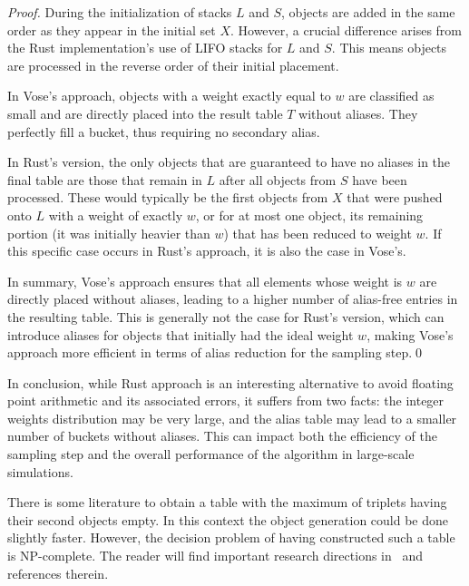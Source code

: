 \begin{proof}
    During the initialization of stacks $L$ and $S$, objects are added in the same order as they appear in the initial set $X$. 
    However, a crucial difference arises from the Rust implementation's use of LIFO stacks for $L$ and $S$. This means objects are processed in the reverse order of their initial placement.

    In Vose's approach, objects with a weight exactly equal to $w$ are classified as small and are directly placed into the result table $T$ without aliases. They perfectly fill a bucket, thus requiring no secondary alias.

    In Rust's version, the only objects that are guaranteed to have no aliases in the final table are those that remain in $L$ after all objects from $S$ have been processed. These would typically be the first objects from $X$ that were pushed onto $L$ with a weight of exactly $w$, or for at most one object, its remaining portion (it was initially heavier than $w$) that has been reduced to weight $w$. If this specific case occurs in Rust's approach, it is also the case in Vose's.

    In summary, Vose's approach ensures that all elements whose weight is $w$ are directly placed without aliases, leading to a higher number of alias-free entries in the resulting table. This is generally not the case for Rust's version, which can introduce aliases for objects that initially had the ideal weight $w$, making Vose's approach more efficient in terms of alias reduction for the sampling step.\qed
\end{proof}

In conclusion, while Rust approach is an interesting alternative to avoid floating point arithmetic and its associated errors, it suffers from two facts: the integer weights distribution may be very large, and the alias table may lead to a smaller number of buckets without aliases. This can impact both the efficiency of the sampling step and the overall performance of the algorithm in large-scale simulations.

There is some literature to obtain a table with the maximum of triplets having their second objects empty.
In this context the object generation could be done slightly faster. However, the decision problem of having constructed such a table is NP-complete. The reader will find important research directions in~\cite{SJ05} and references therein.
